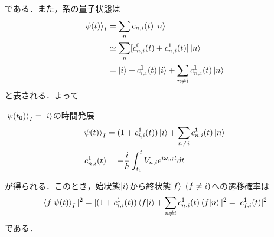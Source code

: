 \documentclass{standalone}
\begin{document}
  である．また，系の量子状態は
  \begin{align}
    \ket{\psi(t)}_I&=\sum_{n}c_{n,i}(t)\ket{n}\\
    &\simeq\sum_{n}[c_{n,i}^0(t)+c_{n,i}^1(t)]\ket{n}\\
    &=\ket{i}+c_{i,i}^1(t)\ket{i}+\sum_{n\ne i}c_{n,i}^1(t)\ket{n}
  \end{align}
  と表される．よって
  \begin{itembox}[l]{$\ket{\psi(t_0)}_I=\ket{i}$の時間発展}
    \begin{align}
      \ket{\psi(t)}_I&=(1+c_{i,i}^1(t))\ket{i}+\sum_{n\ne i}c_{n,i}^1(t)\ket{n}\\
      c_{n,i}^1(t)&=-\frac{i}{\hbar}\int_{t_0}^{t}V_{n,i}\mathrm{e}^{i\omega_{ni}t}dt
    \end{align}
  \end{itembox}
  が得られる．このとき，始状態$\ket{i}$から終状態$\ket{f}\ (f\ne i)$への遷移確率は
  \begin{equation}
    |\braket{f}{\psi(t)}_I|^2=|(1+c_{i,i}^1(t))\braket{f}{i}+\sum_{n\ne i}c_{n,i}^1(t)\braket{f}{n}|^2=|c_{f,i}^1(t)|^2
  \end{equation}
  である．
\end{document}
